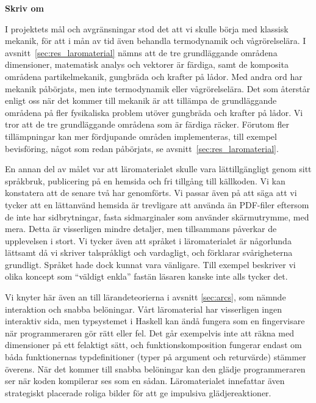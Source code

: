 \textbf{Skriv om}

I projektets mål och avgränsningar stod det att vi skulle börja med klassisk
mekanik, för att i mån av tid även behandla termodynamik och vågrörelselära. I avsnitt~\ref{sec:res_laromaterial} nämns att de tre grundläggande
områdena dimensioner, matematisk analys och vektorer är färdiga, samt de
komposita områdena partikelmekanik, gungbräda och krafter på lådor. Med andra
ord har mekanik påbörjats, men inte termodynamik eller vågrörelselära. Det som återstår enligt oss när det kommer till mekanik är att tillämpa de grundläggande områdena på
fler fysikaliska problem utöver gungbräda och krafter på lådor. Vi tror att de
tre grundläggande områdena som är färdiga räcker. Förutom fler tillämpningar kan
mer fördjupande områden implementeras, till exempel bevisföring, något som redan
påbörjats, se avsnitt~\ref{sec:res_laromaterial}.

En annan del av målet var att läromaterialet skulle vara lättillgängligt genom
sitt språkbruk, publicering på en hemsida och fri tillgång till källkoden.
Vi kan konstatera att de senare två har genomförts. Vi passar även på att
säga att vi tycker att en lättanvänd hemsida är trevligare att använda än
PDF-filer eftersom de inte har sidbrytningar, fasta sidmarginaler som använder
skärmutrymme, med mera. Detta är visserligen mindre detaljer, men tillsammans
påverkar de upplevelsen i stort. Vi
tycker även att språket i läromaterialet är någorlunda lättsamt då vi skriver
talspråkligt och vardagligt, och förklarar svårigheterna grundligt. Språket hade
dock kunnat vara vänligare. Till exempel beskriver vi olika koncept som
``väldigt enkla'' fastän läsaren kanske inte alls tycker det.

Vi knyter här även an till lärandeteorierna i avsnitt \ref{sec:arcs}, som nämnde interaktion och snabba belöningar. Vårt läromaterial har visserligen ingen interaktiv sida, men typsystemet i Haskell kan ändå fungera som en fingervisare när programmeraren gör rätt eller fel. Det går exempelvis inte att räkna med dimensioner på ett felaktigt sätt, och funktionskomposition fungerar endast om båda funktionernas typdefinitioner (typer på argument och returvärde) stämmer överens. När det kommer till snabba belöningar kan den glädje programmeraren ser när koden kompilerar ses som en sådan. Läromaterialet innefattar även strategiskt placerade roliga bilder för att ge impulsiva glädjereaktioner.

